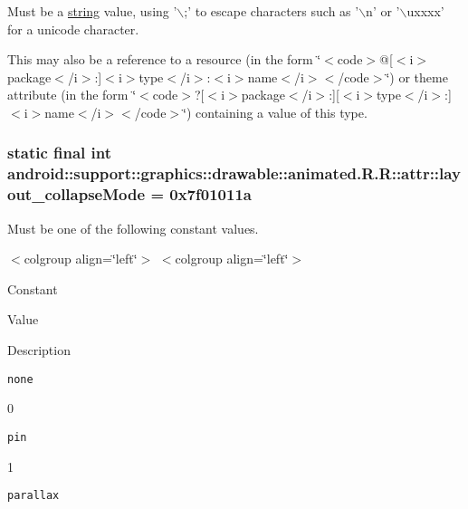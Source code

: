 Must be a \hyperlink{classandroid_1_1support_1_1graphics_1_1drawable_1_1animated_1_1_r_1_1string}{string} value, using '$\backslash$;' to escape characters such as '$\backslash$n' or '$\backslash$uxxxx' for a unicode character. 

This may also be a reference to a resource (in the form \char`\"{}$<$code$>$@\mbox{[}$<$i$>$package$<$/i$>$:\mbox{]}$<$i$>$type$<$/i$>$:$<$i$>$name$<$/i$>$$<$/code$>$\char`\"{}) or theme attribute (in the form \char`\"{}$<$code$>$?\mbox{[}$<$i$>$package$<$/i$>$:\mbox{]}\mbox{[}$<$i$>$type$<$/i$>$:\mbox{]}$<$i$>$name$<$/i$>$$<$/code$>$\char`\"{}) containing a value of this type. \hypertarget{classandroid_1_1support_1_1graphics_1_1drawable_1_1animated_1_1_r_1_1attr_17f1cf0da13b69754b2dc5c996bf02bf}{
\subsubsection[{layout\_\-collapseMode}]{\setlength{\rightskip}{0pt plus 5cm}static final int android::support::graphics::drawable::animated.R.R::attr::layout\_\-collapseMode = 0x7f01011a}}
\label{classandroid_1_1support_1_1graphics_1_1drawable_1_1animated_1_1_r_1_1attr_17f1cf0da13b69754b2dc5c996bf02bf}


Must be one of the following constant values. \begin{TabularC}{0}
\hline
\end{TabularC}
$<$colgroup align=\char`\"{}left\char`\"{}$>$ $<$colgroup align=\char`\"{}left\char`\"{}$>$ 

Constant

Value

Description 

{\tt none}

0

{\tt pin}

1

{\tt parallax}

